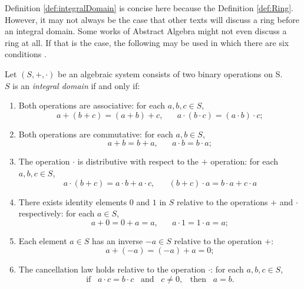 \documentclass{article}
\begin{document}
\begin{remark}
    Definition \ref{def:integralDomain} is concise here because the Definition \ref{def:Ring}. However, it may not always be the case
    that other texts will discuss a ring before an integral domain. Some works of Abstract Algebra might not even discuss a ring at all. If that is the case, the following may be used in which there are six conditions \cite{FirstCourse}. \\

\begin{definition}\label{def:integralDomain2}
    Let $(S,+,\cdot)$ be an algebraic system consists of two binary operations on S. \\  
    $S$ is an \emph{integral domain} if and only if:
    \begin{enumerate}
        \item Both operations are associative: for each $a,b,c \in S$,
             \[
                 a + (b + c) = (a + b) + c, \hspace{20pt}  a \cdot (b \cdot c) = (a \cdot b) \cdot c;
             \]
        \item Both operations are commutative: for each $a,b \in S$,
             \[
                 a + b = b + a, \hspace{20pt}  a \cdot b = b \cdot a;
             \]
        \item The operation $\cdot$ is distributive with respect to the $+$ operation: for each $a,b,c \in S$,
             \[
                 a \cdot (b + c) = a \cdot b + a \cdot c, \hspace{20pt} (b + c) \cdot a = b \cdot a + c \cdot a
             \]
        \item There exists identity elements $0$ and $1$ in $S$ relative to the operations $+$ and $\cdot$ respectively: for each $a \in S$,
             \[
                 a + 0 = 0 + a = a, \hspace{20pt}  a \cdot 1 = 1 \cdot a = a;
             \]
        \item Each element $a \in S$ has an inverse $-a \in S$ relative to the operation $+$:
             \[
                 a + (-a) = (-a) + a = 0;
             \]
        \item The cancellation law holds relative to the operation $\cdot$: for each $a,b,c \in S$,
             \[
                 \text{if} \hspace{10pt} a \cdot c = b \cdot c \hspace{10pt} \text{and} \hspace{10pt} c \neq 0,\hspace{10pt} \text{then} \hspace{10pt}a = b.
             \]
    \end{enumerate}
\end{definition} 
\end{remark}
\end{document}

